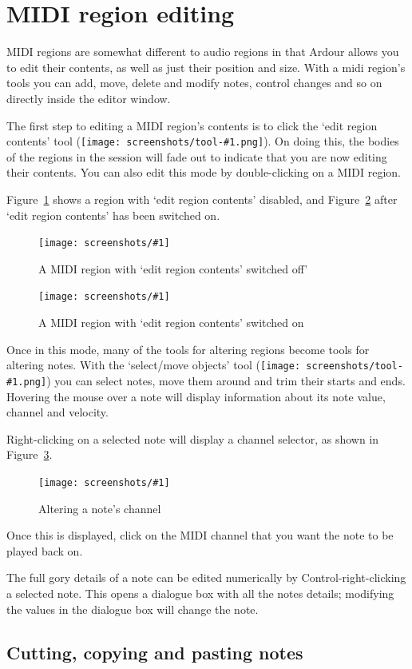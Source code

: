 \documentclass[10pt,a4paper]{book}
\newcommand{\modone}{Control}
\newcommand{\screenshot}[3]{%
\begin{figure}[ht]%
\begin{center}
\texttt{[image: screenshots/\#1]}
\end{center}
\caption{#2}
\label{#3}
\end{figure}}
\newcommand{\inlinetool}[1]{\texttt{[image: screenshots/tool-\#1.png]}}
\begin{document}
{\section{MIDI region editing}

MIDI regions are somewhat different to audio regions in that Ardour
allows you to edit their contents, as well as just their position and
size.  With a midi region's tools you can add, move, delete and modify
notes, control changes and so on directly inside the editor window.

The first step to editing a MIDI region's contents is to click the
`edit region contents' tool (\inlinetool{region-contents}).
On doing this, the bodies of the regions in the session will fade out
to indicate that you are now editing their contents.  You can also
edit this mode by double-clicking on a MIDI region.

Figure~\ref{fig:midi-edit1} shows a region with `edit region contents'
disabled, and Figure~\ref{fig:midi-edit2} after `edit region contents'
has been switched on.

\screenshot{midi-edit1.png}{A MIDI region with `edit region contents' switched off'}{fig:midi-edit1}
\screenshot{midi-edit2.png}{A MIDI region with `edit region contents' switched on}{fig:midi-edit2}

Once in this mode, many of the tools for altering regions become tools
for altering notes.  With the `select/move objects' tool
(\inlinetool{objects}) you can select notes, move them
around and trim their starts and ends.  Hovering the mouse over a note
will display information about its note value, channel and velocity.

Right-clicking on a selected note will display a channel selector, as
shown in Figure~\ref{fig:midi-edit5.png}.

\screenshot{midi-edit5.png}{Altering a note's channel}{fig:midi-edit5.png}

Once this is displayed, click on the MIDI channel that you want the
note to be played back on.

The full gory details of a note can be edited numerically by
\modone{}-right-clicking a selected note.  This opens a dialogue box
with all the notes details; modifying the values in the dialogue box
will change the note.


\subsection{Cutting, copying and pasting notes}

}
\end{document}

